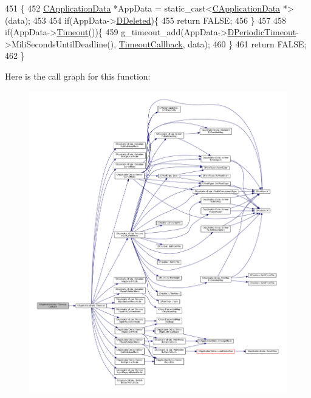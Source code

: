 \begin{DoxyCode}
451                                                        \{
452     \hyperlink{classCApplicationData}{CApplicationData} *AppData = \textcolor{keyword}{static\_cast<}\hyperlink{classCApplicationData}{CApplicationData} *\textcolor{keyword}{>}(data);
453 
454     \textcolor{keywordflow}{if}(AppData->\hyperlink{classCApplicationData_a0a8651f95f3d48befd6e02a286ecdc82}{DDeleted})\{
455         \textcolor{keywordflow}{return} FALSE;   
456     \}
457     
458     \textcolor{keywordflow}{if}(AppData->\hyperlink{classCApplicationData_aae0775b38fac01308e8a81b64db49500}{Timeout}())\{
459         g\_timeout\_add(AppData->\hyperlink{classCApplicationData_a0265cb7aba9f099faed2a1c8ee588d33}{DPeriodicTimeout}->MiliSecondsUntilDeadline(), 
      \hyperlink{classCApplicationData_af66e15f6935f053b46a11aaa51a869c9}{TimeoutCallback}, data);
460     \}
461     \textcolor{keywordflow}{return} FALSE;
462 \}
\end{DoxyCode}
Here is the call graph for this function\+:\nopagebreak
\begin{figure}[H]
\begin{center}
\leavevmode
\includegraphics[width=350pt]{classCApplicationData_af66e15f6935f053b46a11aaa51a869c9_cgraph}
\end{center}
\end{figure}
